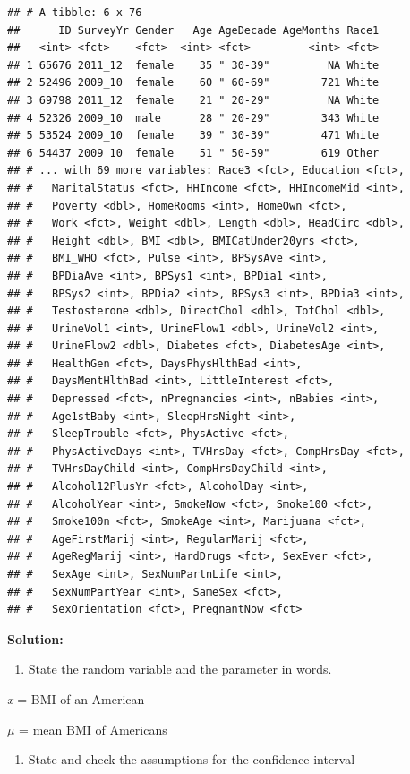 \documentclass[
]{book}
\providecommand{\tightlist}{%
  \setlength{\itemsep}{0pt}\setlength{\parskip}{0pt}}
\begin{document}
\begin{verbatim}
## # A tibble: 6 x 76
##      ID SurveyYr Gender   Age AgeDecade AgeMonths Race1
##   <int> <fct>    <fct>  <int> <fct>         <int> <fct>
## 1 65676 2011_12  female    35 " 30-39"         NA White
## 2 52496 2009_10  female    60 " 60-69"        721 White
## 3 69798 2011_12  female    21 " 20-29"         NA White
## 4 52326 2009_10  male      28 " 20-29"        343 White
## 5 53524 2009_10  female    39 " 30-39"        471 White
## 6 54437 2009_10  female    51 " 50-59"        619 Other
## # ... with 69 more variables: Race3 <fct>, Education <fct>,
## #   MaritalStatus <fct>, HHIncome <fct>, HHIncomeMid <int>,
## #   Poverty <dbl>, HomeRooms <int>, HomeOwn <fct>,
## #   Work <fct>, Weight <dbl>, Length <dbl>, HeadCirc <dbl>,
## #   Height <dbl>, BMI <dbl>, BMICatUnder20yrs <fct>,
## #   BMI_WHO <fct>, Pulse <int>, BPSysAve <int>,
## #   BPDiaAve <int>, BPSys1 <int>, BPDia1 <int>,
## #   BPSys2 <int>, BPDia2 <int>, BPSys3 <int>, BPDia3 <int>,
## #   Testosterone <dbl>, DirectChol <dbl>, TotChol <dbl>,
## #   UrineVol1 <int>, UrineFlow1 <dbl>, UrineVol2 <int>,
## #   UrineFlow2 <dbl>, Diabetes <fct>, DiabetesAge <int>,
## #   HealthGen <fct>, DaysPhysHlthBad <int>,
## #   DaysMentHlthBad <int>, LittleInterest <fct>,
## #   Depressed <fct>, nPregnancies <int>, nBabies <int>,
## #   Age1stBaby <int>, SleepHrsNight <int>,
## #   SleepTrouble <fct>, PhysActive <fct>,
## #   PhysActiveDays <int>, TVHrsDay <fct>, CompHrsDay <fct>,
## #   TVHrsDayChild <int>, CompHrsDayChild <int>,
## #   Alcohol12PlusYr <fct>, AlcoholDay <int>,
## #   AlcoholYear <int>, SmokeNow <fct>, Smoke100 <fct>,
## #   Smoke100n <fct>, SmokeAge <int>, Marijuana <fct>,
## #   AgeFirstMarij <int>, RegularMarij <fct>,
## #   AgeRegMarij <int>, HardDrugs <fct>, SexEver <fct>,
## #   SexAge <int>, SexNumPartnLife <int>,
## #   SexNumPartYear <int>, SameSex <fct>,
## #   SexOrientation <fct>, PregnantNow <fct>
\end{verbatim}

\textbf{Solution:}

\begin{enumerate}
\def\labelenumi{\arabic{enumi}.}
\tightlist
\item
  State the random variable and the parameter in words.
\end{enumerate}

\emph{x} = BMI of an American

\(\mu\) = mean BMI of Americans

\begin{enumerate}
\def\labelenumi{\arabic{enumi}.}
\setcounter{enumi}{1}
\tightlist
\item
  State and check the assumptions for the confidence interval
\end{enumerate}
\end{document}
